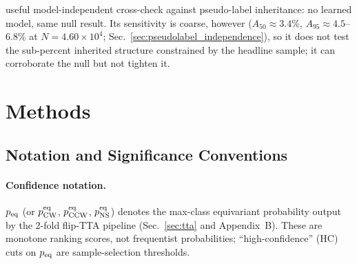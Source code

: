 \documentclass[aps,prd,twocolumn,superscriptaddress,preprintnumbers,nofootinbib,longbibliography,floatfix]{revtex4-2}
\begin{document}
useful model-independent cross-check against pseudo-label inheritance: no learned model, same null result. Its sensitivity is coarse, however ($A_{50}\!\approx\!3.4\%$, $A_{95}\!\approx\!4.5$--$6.8\%$ at $N\!=\!4.60\!\times\!10^4$; Sec.~\ref{sec:pseudolabel_independence}), so it does not test the sub-percent inherited structure constrained by the headline sample; it can corroborate the null but not tighten it.

\section{Methods}
\label{sec:methods}

\subsection{Notation and Significance Conventions}
\label{sec:notation}

\paragraph{Confidence notation.}
$p_{\rm eq}$ (or $p_{\rm CW}^{\rm eq}$, $p_{\rm CCW}^{\rm eq}$, $p_{\rm NS}^{\rm eq}$) denotes the max-class equivariant probability output by the 2-fold flip-TTA pipeline (Sec.~\ref{sec:tta} and Appendix~B). These are monotone ranking scores, not frequentist probabilities; ``high-confidence'' (HC) cuts on $p_{\rm eq}$ are sample-selection thresholds.
\end{document}
